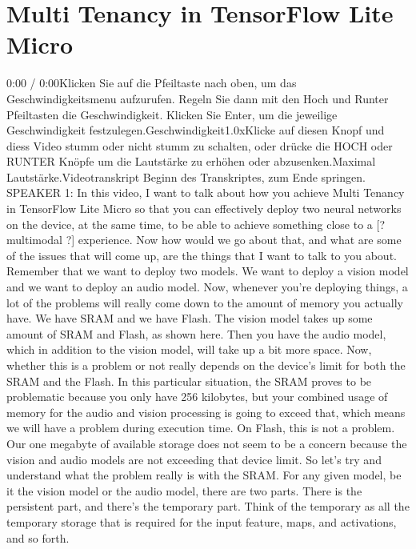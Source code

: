  \section{Multi Tenancy in TensorFlow Lite Micro}
 
     0:00 / 0:00Klicken Sie auf die Pfeiltaste nach oben, um das Geschwindigkeitsmenu aufzurufen. Regeln Sie dann mit den Hoch und Runter Pfeiltasten die Geschwindigkeit. Klicken Sie Enter, um die jeweilige Geschwindigkeit festzulegen.Geschwindigkeit1.0xKlicke auf diesen Knopf und diess Video stumm oder nicht stumm zu schalten, oder drücke die HOCH oder RUNTER Knöpfe um die Lautstärke zu erhöhen oder abzusenken.Maximal Lautstärke.Videotranskript
     Beginn des Transkriptes, zum Ende springen.
     SPEAKER 1: In this video, I want to talk about how
     you achieve Multi Tenancy in TensorFlow Lite Micro
     so that you can effectively deploy two neural networks on the device,
     at the same time, to be able to achieve something close to a [? multimodal ?]
     experience.
     Now how would we go about that, and what are
     some of the issues that will come up, are the things
     that I want to talk to you about.
     Remember that we want to deploy two models.
     We want to deploy a vision model and we want to deploy an audio model.
     Now, whenever you're deploying things, a lot of the problems
     will really come down to the amount of memory you actually have.
     We have SRAM and we have Flash.
     The vision model takes up some amount of SRAM and Flash, as shown here.
     Then you have the audio model, which in addition to the vision model,
     will take up a bit more space.
     Now, whether this is a problem or not really
     depends on the device's limit for both the SRAM and the Flash.
     In this particular situation, the SRAM proves
     to be problematic because you only have 256 kilobytes,
     but your combined usage of memory for the audio and vision processing
     is going to exceed that, which means we will have a problem during execution
     time.
     On Flash, this is not a problem.
     Our one megabyte of available storage does not
     seem to be a concern because the vision and audio models
     are not exceeding that device limit.
     So let's try and understand what the problem really is with the SRAM.
     For any given model, be it the vision model or the audio model,
     there are two parts.
     There is the persistent part, and there's the temporary part.
     Think of the temporary as all the temporary storage
     that is required for the input feature, maps, and activations, and so forth.
